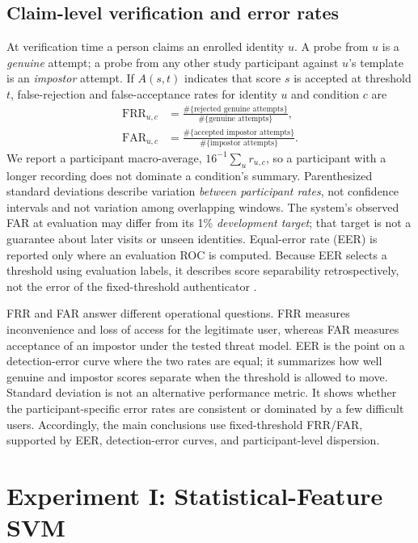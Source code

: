 \documentclass[conference]{IEEEtran}
\begin{document}
\subsection{Claim-level verification and error rates}
At verification time a person claims an enrolled identity $u$. A probe from $u$ is a \emph{genuine} attempt; a probe from any other study participant against $u$'s template is an \emph{impostor} attempt. If $A(s,t)$ indicates that score $s$ is accepted at threshold $t$, false-rejection and false-acceptance rates for identity $u$ and condition $c$ are
\begin{align}
\mathrm{FRR}_{u,c}&=\frac{\#\{\text{rejected genuine attempts}\}}
{\#\{\text{genuine attempts}\}},\\
\mathrm{FAR}_{u,c}&=\frac{\#\{\text{accepted impostor attempts}\}}
{\#\{\text{impostor attempts}\}}.
\end{align}
We report a participant macro-average, $16^{-1}\sum_u r_{u,c}$, so a participant with a longer recording does not dominate a condition's summary. Parenthesized standard deviations describe variation \emph{between participant rates}, not confidence intervals and not variation among overlapping windows. The system's observed FAR at evaluation may differ from its 1\% \emph{development target}; that target is not a guarantee about later visits or unseen identities. Equal-error rate (EER) is reported only where an evaluation ROC is computed. Because EER selects a threshold using evaluation labels, it describes score separability retrospectively, not the error of the fixed-threshold authenticator \cite{Jain2004}.

FRR and FAR answer different operational questions. FRR measures inconvenience and loss of access for the legitimate user, whereas FAR measures acceptance of an impostor under the tested threat model. EER is the point on a detection-error curve where the two rates are equal; it summarizes how well genuine and impostor scores separate when the threshold is allowed to move. Standard deviation is not an alternative performance metric. It shows whether the participant-specific error rates are consistent or dominated by a few difficult users. Accordingly, the main conclusions use fixed-threshold FRR/FAR, supported by EER, detection-error curves, and participant-level dispersion.

\section{Experiment I: Statistical-Feature SVM}
\end{document}
